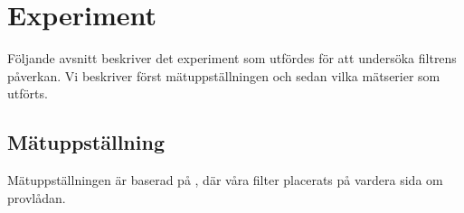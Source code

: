 \documentclass[main.tex]{subfiles}
\begin{document}
\chapter{Experiment}
\label{ch:exp}
Följande avsnitt beskriver det experiment som utfördes för att undersöka filtrens påverkan. Vi beskriver först mätuppställningen och sedan vilka mätserier som utförts.



\section{Mätuppställning}
Mätuppställningen är baserad på , där våra filter placerats på vardera sida om provlådan.

\end{document}
